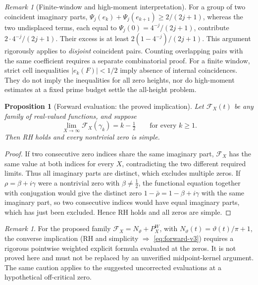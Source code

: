 \documentclass[11pt,a4paper]{article}
\numberwithin{equation}{section}
\newtheorem{proposition}[theorem]{Proposition}
\theoremstyle{definition}
\theoremstyle{remark}
\newtheorem{remark}[theorem]{Remark}
\begin{document}
\begin{remark}[Finite-window and high-moment interpretation]
For a group of two coincident imaginary parts,
$\Psi_j(e_k)+\Psi_j(e_{k+1})\ge2/(2j+1)$, whereas the two undisplaced
terms, each equal to $\Psi_j(0)=4^{-j}/(2j+1)$, contribute $2\cdot4^{-j}/(2j+1)$. Their excess is at least
$2(1-4^{-j})/(2j+1)$. This argument rigorously applies to
\emph{disjoint} coincident pairs. Counting overlapping pairs with the
same coefficient requires a separate combinatorial proof.
For a finite window, strict cell inequalities $|e_k(F)|<1/2$ imply
absence of internal coincidences. They do not imply the inequalities
for all zero heights, nor do high-moment estimates at a fixed prime
budget settle the all-height problem.
\end{remark}

\begin{proposition}[Forward evaluation: the proved implication]
\label{prop:forward-v3}
Let $\mathscr F_X(t)$ be any family of real-valued functions, and suppose
\begin{equation}\label{eq:forward-v3}
\lim_{X\to\infty}\mathscr F_X(\gamma_k)=k-\tfrac12
\qquad\text{for every }k\ge1.
\end{equation}
Then RH holds and every nontrivial zero is simple.
\end{proposition}
\begin{proof}
If two consecutive zero indices share the same imaginary part,
$\mathscr F_X$ has the same value at both indices for every $X$,
contradicting the two different required limits. Thus all imaginary
parts are distinct, which excludes multiple zeros. If $\rho=\beta+i\gamma$ were a nontrivial zero with $\beta\ne\frac12$, the functional equation together with conjugation would give the distinct zero $1-\bar\rho=1-\beta+i\gamma$ with the same imaginary part, so two consecutive indices would have equal imaginary parts, which has just been excluded. Hence RH holds and all zeros are simple.
\end{proof}
\begin{remark}
For the proposed family
$\mathscr F_X=N_\vartheta+P_X^W$, with
$N_\vartheta(t)=\vartheta(t)/\pi+1$, the converse implication
(RH and simplicity $\Rightarrow$ \eqref{eq:forward-v3}) requires a
rigorous pointwise weighted explicit formula evaluated at the zeros.
It is not proved here and must not be replaced by an unverified
midpoint-kernel argument. The same caution applies to the suggested
uncorrected evaluations at a hypothetical off-critical zero.
\end{remark}
\end{document}
